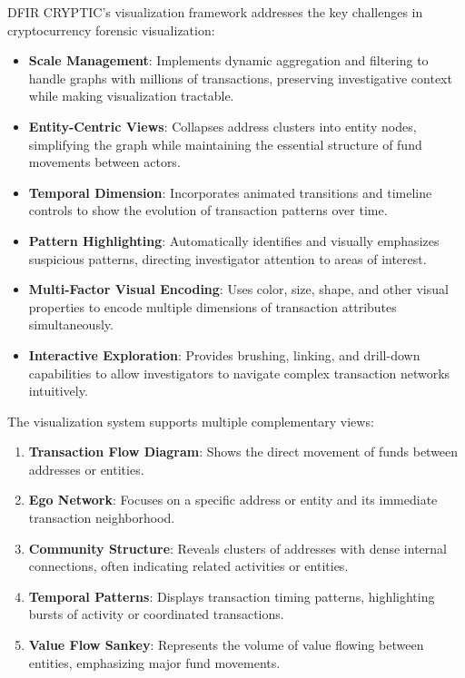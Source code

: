 \documentclass[conference]{IEEEtran}
\begin{document}
DFIR CRYPTIC's visualization framework addresses the key challenges in cryptocurrency forensic visualization:

\begin{itemize}
    \item \textbf{Scale Management}: Implements dynamic aggregation and filtering to handle graphs with millions of transactions, preserving investigative context while making visualization tractable.
    
    \item \textbf{Entity-Centric Views}: Collapses address clusters into entity nodes, simplifying the graph while maintaining the essential structure of fund movements between actors.
    
    \item \textbf{Temporal Dimension}: Incorporates animated transitions and timeline controls to show the evolution of transaction patterns over time.
    
    \item \textbf{Pattern Highlighting}: Automatically identifies and visually emphasizes suspicious patterns, directing investigator attention to areas of interest.
    
    \item \textbf{Multi-Factor Visual Encoding}: Uses color, size, shape, and other visual properties to encode multiple dimensions of transaction attributes simultaneously.
    
    \item \textbf{Interactive Exploration}: Provides brushing, linking, and drill-down capabilities to allow investigators to navigate complex transaction networks intuitively.
\end{itemize}

The visualization system supports multiple complementary views:

\begin{enumerate}
    \item \textbf{Transaction Flow Diagram}: Shows the direct movement of funds between addresses or entities.
    
    \item \textbf{Ego Network}: Focuses on a specific address or entity and its immediate transaction neighborhood.
    
    \item \textbf{Community Structure}: Reveals clusters of addresses with dense internal connections, often indicating related activities or entities.
    
    \item \textbf{Temporal Patterns}: Displays transaction timing patterns, highlighting bursts of activity or coordinated transactions.
    
    \item \textbf{Value Flow Sankey}: Represents the volume of value flowing between entities, emphasizing major fund movements.
\end{enumerate}
\end{document}
